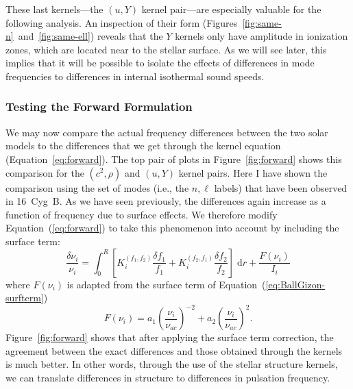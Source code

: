 These last kernels---the ${(u,Y)}$ kernel pair---are especially valuable for the following analysis. 
An inspection of their form (Figures~\ref{fig:same-n}~and~\ref{fig:same-ell}) reveals that the $Y$ kernels only have amplitude in ionization zones, which are located near to the stellar surface. 
As we will see later, this implies that it will be possible to isolate the effects of differences in mode frequencies to differences in internal isothermal sound speeds. 

\subsubsection*{Testing the Forward Formulation}

We may now compare the actual frequency differences between the two solar models to the differences that we get through the kernel equation (Equation~\ref{eq:forward}). 
The top pair of plots in Figure~\ref{fig:forward} shows this comparison for the ${(c^2, \rho)}$ and ${(u, Y)}$ kernel pairs. 
Here I have shown the comparison using the set of modes (i.e., the ${n,\ell}$ labels) that have been observed in 16~Cyg~B. 
As we have seen previously, the differences again increase as a function of frequency due to surface effects. 
We therefore modify Equation~(\ref{eq:forward}) to take this phenomenon into account by including the \citet{2014A&A...568A.123B} surface term: 
\begin{equation} \label{eq:forward-surf} \boxed{
  \frac{\delta\nu_i}{\nu_i} 
  = 
  \int_0^R \left[ K_i^{(f_1, f_2)} \frac{\delta f_1}{f_1}
                + K_i^{(f_2, f_1)} \frac{\delta f_2}{f_2}
          \right] \; \text{d}r
    + \frac{F(\nu_i)}{I_i}
}\end{equation}
where ${F(\nu_i)}$ is adapted from the surface term of Equation~(\ref{eq:BallGizon-surfterm})
\begin{equation}
    F(\nu_i) %
    = 
    a_1 \left( \frac{\nu_i}{\nu_{ac}} \right)^{-2} + a_2 \left( \frac{\nu_i}{\nu_{ac}} \right)^{2}.
\end{equation}
Figure~\ref{fig:forward} shows that after applying the surface term correction, the agreement between the exact differences and those obtained through the kernels is much better. 
In other words, through the use of the stellar structure kernels, we can translate differences in structure to differences in pulsation frequency. 


